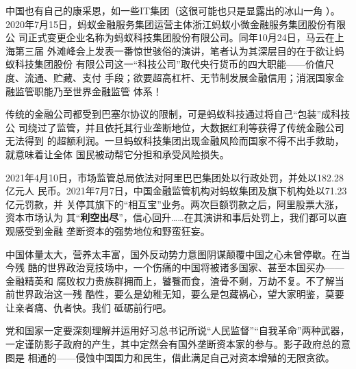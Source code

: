 中国也有自己的康采恩，如一些IT集团（这很可能也只是显露出的冰山一角
）。2020年7月15日，蚂蚁金融服务集团运营主体浙江蚂蚁小微金融服务集团股份有限公
司正式变更企业名称为蚂蚁科技集团股份有限公司。同年10月24日，马云在上海第三届
外滩峰会上发表一番惊世骇俗的演讲，笔者认为其深层目的在于欲让蚂蚁科技集团股份
有限公司这一“科技公司”取代央行货币的四大职能——价值尺度、流通、贮藏、支付
手段；欲要超高杠杆、无节制发展金融信用；消泯国家金融监管职能乃至世界金融监管
体系！

传统的金融公司都受到巴塞尔协议的限制，可是蚂蚁科技通过将自己“包装”成科技公
司绕过了监管，并且依托其行业垄断地位，大数据红利等获得了传统金融公司无法得到
的超额利润。一旦蚂蚁科技集团出现金融风险而国家不得不出手救助，就意味着让全体
国民被动帮它分担和承受风险损失。


2021年4月10日，市场监管总局依法对阿里巴巴集团处以行政处罚，并处以182.28亿元人
民币。2021年7月7日，中国金融监管机构对蚂蚁集团及旗下机构处以71.23亿元罚款，并
关停其旗下的“相互宝”业务。两次巨额罚款之后，阿里股票大涨，资本市场认为
其“\textbf{利空出尽}”，信心回升……在其演讲和事后处罚上，我们都可以直观感受到金融
垄断资本的强势地位和野蛮狂妄。


中国体量太大，营养太丰富，国外反动势力意图阴谋颠覆中国之心未曾停歇。在当今残
酷的世界政治竞技场中，一个伤痛的中国将被诸多国家、甚至本国买办——金融精英和
腐败权力贵族群拥而上，饕餮而食，渣骨不剩，万劫不复。不了解当前世界政治这一残
酷性，要么是幼稚无知，要么是包藏祸心，望大家明鉴，莫要让亲者痛、仇者快。我们
砥砺前行吧。

党和国家一定要深刻理解并运用好习总书记所说“人民监督”“自我革命”两种武器，
一定谨防影子政府的产生，其中定然会有国外垄断资本家的参与。影子政府总的意图是
相通的——侵蚀中国国力和民生，借此满足自己对资本增殖的无限贪欲。











